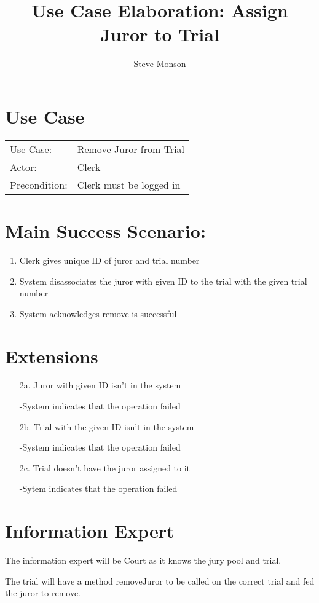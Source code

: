 \documentclass{article}
\title{Use Case Elaboration: Assign Juror to Trial}
\author{Steve Monson}
\begin{document}
\maketitle

\section*{Use Case}
\begin{tabular}{l l}
  Use Case:     & Remove Juror from Trial\\
  Actor:        & Clerk\\
  Precondition: & Clerk must be logged in\\
\end{tabular}

\section*{Main Success Scenario:}
\begin{enumerate}
  \item Clerk gives unique ID of juror and trial number
  \item System disassociates the juror with given ID to the trial with the given trial number
  \item System acknowledges remove is successful
\end{enumerate}

\section*{Extensions}
\begin{itemize}
  \item [2a.] Juror with given ID isn't in the system
  
    -System indicates that the operation failed
  
  \item [2b.] Trial with the given ID isn't in the system

    -System indicates that the operation failed
    
  \item [2c.] Trial doesn't have the juror assigned to it
  
    -Sytem indicates that the operation failed

\end{itemize}

\section*{Information Expert}

The information expert will be Court as it knows the jury pool and trial.

The trial will have a method removeJuror to be called on the correct trial and fed the juror to remove. 
\end{document}
